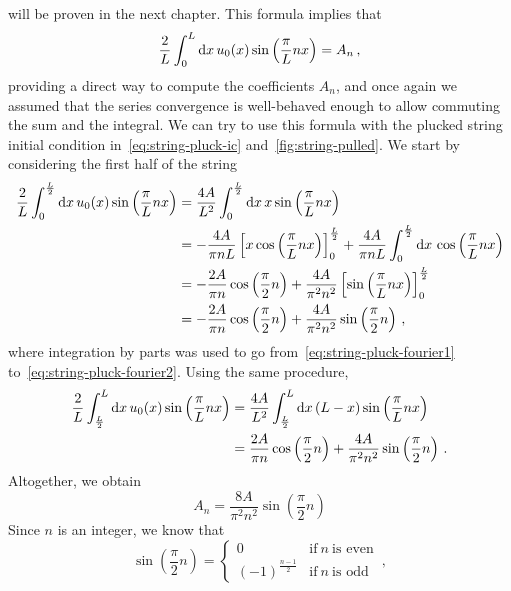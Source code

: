 will be proven in the next chapter. This formula implies that
\begin{equation}
  \frac{2}{L}\int_{0}^{L}\mathrm{d} x\, u_0(x)\sin\left(\frac{\pi}{L}nx\right)=A_n\,,
\end{equation}
providing a direct way to compute the coefficients $A_n$, and once again we assumed that
the series convergence is well-behaved enough to allow commuting the sum and the integral.
We can try to use this formula with the plucked string initial condition
in~\cref{eq:string-pluck-ic} and~\cref{fig:string-pulled}. We start by considering the
first half of the string
\begin{align}
  \frac{2}{L}\int_{0}^{\frac{L}{2}}\mathrm{d} x\, u_0(x)\sin\left(\frac{\pi}{L}nx\right)&
  =\frac{4A}{L^2}\int_{0}^{\frac{L}{2}}\mathrm{d} x\, x\sin\left(\frac{\pi}{L}nx\right)\\
  \label{eq:string-pluck-fourier1}
  &=-\frac{4A}{\pi n L}\left[x\cos\left(\frac{\pi}{L}nx\right)\right]_0^{\frac{L}{2}}
  +\frac{4A}{\pi n L}\int_{0}^{\frac{L}{2}}\mathrm{d} x\,\cos\left(\frac{\pi}{L}nx\right)\\
  \label{eq:string-pluck-fourier2}
  &=-\frac{2A}{\pi n}\cos\left(\frac{\pi}{2}n\right)+\frac{4A}{\pi^2 n^2}
  \left[\sin\left(\frac{\pi}{L}nx\right)\right]_0^{\frac{L}{2}}\\
  &=-\frac{2A}{\pi n}\cos\left(\frac{\pi}{2}n\right)+\frac{4A}{\pi^2 n^2}
  \sin\left(\frac{\pi}{2}n\right)\,,
\end{align}
where integration by parts was used to go from~\cref{eq:string-pluck-fourier1}
to~\cref{eq:string-pluck-fourier2}. Using the same procedure,
\begin{align}
  \frac{2}{L}\int_{\frac{L}{2}}^{L}\mathrm{d} x\, u_0(x)\sin\left(\frac{\pi}{L}nx\right)
  &=\frac{4A}{L^2}\int_{\frac{L}{2}}^{L}\mathrm{d} x\, (L-x)\sin\left(\frac{\pi}{L}nx\right)\\
  &=\frac{2A}{\pi n}\cos\left(\frac{\pi}{2}n\right)+\frac{4A}{\pi^2 n^2}
  \sin\left(\frac{\pi}{2}n\right)\,.
\end{align}
Altogether, we obtain
\begin{equation}
  A_n=\frac{8A}{\pi^2 n^2}\sin\left(\frac{\pi}{2}n\right)
\end{equation}
Since $n$ is an integer, we know that
\begin{equation}
  \sin\left(\frac{\pi}{2}n\right)=
  \begin{cases}
    0&\text{if}~n~\text{is even}\\
    (-1)^{\frac{n-1}{2}}&\text{if}~n~\text{is odd}
  \end{cases}\,,\label{eq:sinpn2}
\end{equation}
